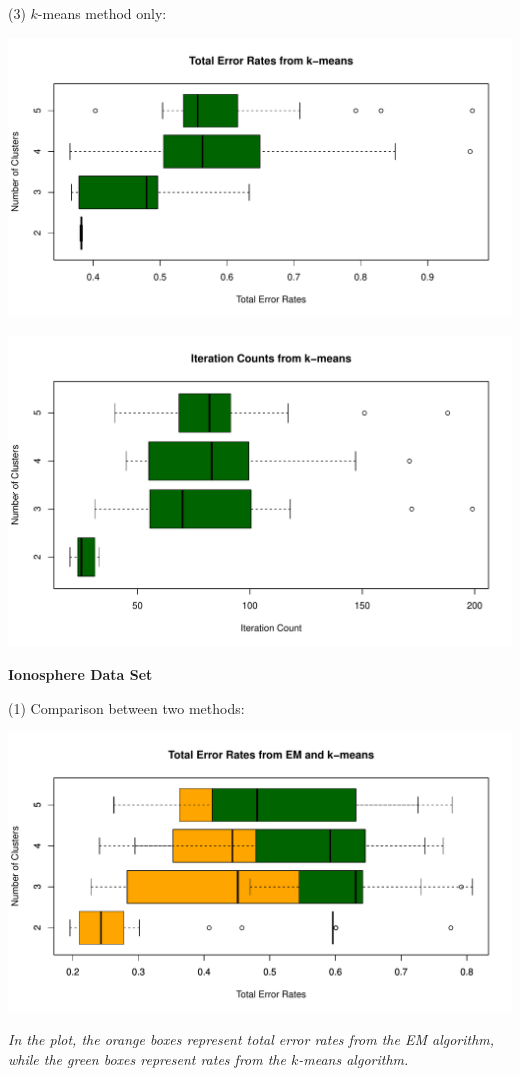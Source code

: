 \documentclass[a4paper,12pt]{article}
\begin{document}
\noindent (3) $k$-means method only:
\begin{center}
  \includegraphics[width=0.8\linewidth]{Image/Prob3-TotalErr-Ringnorm-kmeans.pdf}
\end{center}
\begin{center}
  \includegraphics[width=0.8\linewidth]{Image/Prob3-ItrCount-Ringnorm-kmeans.pdf}
\end{center}







\bigskip
\begin{center}
    \textcolor{mydarkgreen}{\textbf{Ionosphere Data Set}}
\end{center}

\noindent (1) Comparison between two methods:

\begin{center}
  \includegraphics[width=0.9\linewidth]{Image/Prob3-TotalErr-Ionosphere-Both.pdf}
  
   \parbox{0.9\textwidth}{\textit{In the plot, the \textcolor{myorange}{orange boxes} represent total error rates from the EM algorithm, while the \textcolor{mydarkgreen}{green boxes} represent rates from the $k$-means algorithm.
  }}
\end{center}
\bigskip
\end{document}
